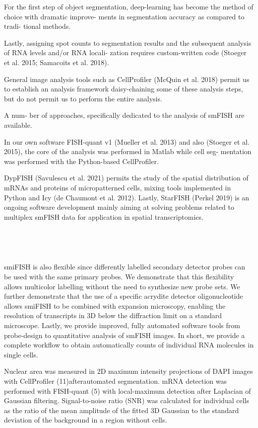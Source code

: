 For the first step of object segmentation, deep-learning has become the method of
choice with dramatic improve- ments in segmentation accuracy as compared to tradi- tional methods.

Lastly, assigning spot counts to segmentation results and the subsequent analysis of
RNA levels and/or RNA locali- zation requires custom-written code (Stoeger et al. 2015; Samacoits et al. 2018).

General image analysis tools such as CellProfiler (McQuin et al. 2018) permit us
to establish an analysis framework daisy-chaining some of these analysis steps,
but do not permit us to perform the entire analysis.

A num- ber of approaches,
specifically dedicated to the analysis of smFISH are available.

In our own software
FISH-quant v1 (Mueller et al. 2013) and also (Stoeger et al. 2015), the core of
the analysis was performed in Matlab while cell seg- mentation was performed with
the Python-based CellProfiler.

DypFISH (Savulescu et al. 2021) permits the study
of the spatial distribution of mRNAs and proteins of micropatterned cells, mixing
tools implemented in Python and Icy (de Chaumont et al. 2012). Lastly, StarFISH
(Perkel 2019) is an ongoing software
development mainly aiming at solving problems related to multiplex smFISH data
for application in spatial transcriptomics.


~\cite{mueller_fish-quant_2013} %

~\cite{tsanov_smifish_2016}

smiFISH is also flexible since differently labelled secondary detector probes
can be used with the same primary probes. We demonstrate that this flexibility
allows multicolor labelling without the need to synthesize new probe sets. We
further demonstrate that the use of a specific acrydite detector oligonucleotide
allows smiFISH to be combined with expansion microscopy, enabling the resolution
of transcripts in 3D below the diffraction limit on a standard microscope.
Lastly, we provide improved, fully automated software tools from probe-design
to quantitative analysis of smFISH images. In short, we provide a complete
workflow to obtain automatically counts of individual RNA molecules in single cells.

Nuclear area was measured in 2D maximum intensity projections of DAPI images
with CellProfiler (11)afterautomated segmentation. mRNA detection was performed
with FISH-quant (5) with local-maximum detection after Laplacian of Gaussian
filtering. Signal-to-noise ratio (SNR) was calculated for individual cells as
the ratio of the mean amplitude of the fitted 3D Gaussian to the standard
deviation of the background in a region without cells.

